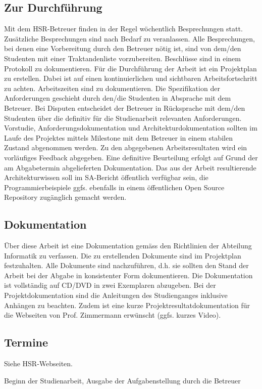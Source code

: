 \subsection{Zur Durchführung}
Mit dem HSR-Betreuer finden in der Regel wöchentlich Besprechungen statt. Zusätzliche Besprechungen sind nach Bedarf zu veranlassen. 
Alle Besprechungen, bei denen eine Vorbereitung durch den Betreuer nötig ist, sind von dem/den Studenten mit einer Traktandenliste vorzubereiten. Beschlüsse sind in einem Protokoll zu dokumentieren.
Für die Durchführung der Arbeit ist ein Projektplan zu erstellen. Dabei ist auf einen kontinuierlichen und sichtbaren Arbeitsfortschritt zu achten. Arbeitszeiten sind zu dokumentieren. 
Die Spezifikation der Anforderungen geschieht durch den/die Studenten in Absprache mit dem Betreuer. Bei Disputen entscheidet der Betreuer in Rücksprache mit dem/den Studenten über die definitiv für die Studienarbeit relevanten Anforderungen.  
Vorstudie, Anforderungsdokumentation und Architekturdokumentation sollten im Laufe des Projektes mittels Milestone mit dem Betreuer in einem stabilen Zustand abgenommen werden. Zu den abgegebenen Arbeitsresultaten wird ein vorläufiges Feedback abgegeben. Eine definitive Beurteilung erfolgt auf Grund der am Abgabetermin abgelieferten Dokumentation.
Das aus der Arbeit resultierende Architekturwissen soll im SA-Bericht öffentlich verfügbar sein, die Programmierbeispiele ggfs. ebenfalls in einem öffentlichen Open Source Repository zugänglich gemacht werden. 
\subsection{Dokumentation}
Über diese Arbeit ist eine Dokumentation gemäss den Richtlinien der Abteilung Informatik zu verfassen. Die zu erstellenden Dokumente sind im Projektplan festzuhalten. Alle Dokumente sind nachzuführen, d.h. sie sollten den Stand der Arbeit bei der Abgabe in konsistenter Form dokumentieren. Die Dokumentation ist vollständig auf CD/DVD in zwei Exemplaren abzugeben. Bei der Projektdokumentation sind die Anleitungen des Studienganges inklusive Anhängen zu beachten. Zudem ist eine kurze Projektresultatdokumentation für die Webseiten von Prof. Zimmermann erwünscht (ggfs. kurzes Video).

\subsection{Termine} 
Siehe HSR-Webseiten.

Beginn der Studienarbeit, 
Ausgabe der Aufgabenstellung durch die Betreuer

